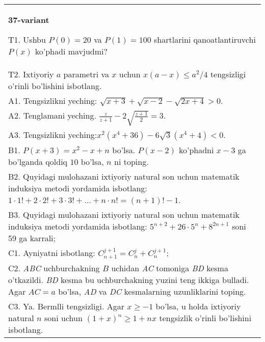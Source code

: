 \documentclass{article}
\begin{document}
\begin{tabular}{m{17cm}}
\textbf{37-variant}
\newline

T1. Ushbu \(P(0) = 20\) va \(P(1) = 100\) shartlarini qanoatlantiruvchi \(P(x)\) ko'phadi mavjudmi? \\
T2. Ixtiyoriy \(a\) parametri va \(x\) uchun \(x(a - x) \leq a^{2}/4\) tengsizligi o'rinli bo'lishini isbotlang. \\
A1. Tengsizlikni yeching: \(\sqrt{x + 3} + \sqrt{x - 2} - \sqrt{2x + 4} > 0\). \\
A2. Tenglamani yeching. \(\frac{z}{z + 1} - 2\sqrt{\frac{z + 1}{2}} = 3\). \\
A3. Tengsizlikni yeching:\(x^{2}\left( x^{4} + 36 \right) - 6\sqrt{3}\left( x^{4} + 4 \right) < 0\). \\
B1. \(P(x + 3) = x^{2} - x + n\) bo'lsa. \(P(x - 2)\) ko'phadni \(x - 3\) ga bo'lganda qoldiq \(10\) bo'lsa, \(n\) ni toping. \\
B2. Quyidagi mulohazani ixtiyoriy natural son uchun matematik induksiya metodi yordamida isbotlang: \(1 \cdot 1! + 2 \cdot 2! + 3 \cdot 3! + \ldots + n \cdot n! = (n + 1)! - 1\). \\
B3. Quyidagi mulohazani ixtiyoriy natural son uchun matematik induksiya metodi yordamida isbotlang: \(5^{n + 2} + 26 \cdot 5^{n} + 8^{2n + 1}\) soni 59 ga karrali; \\
C1. Ayniyatni isbotlang: \(C_{n + 1}^{j + 1} = C_{n}^{j} + C_{n}^{j + 1}\); \\
C2. \emph{ABC} uchburchakning \(B\) uchidan \emph{AC} tomoniga \emph{BD} kesma o'tkazildi. \emph{BD} kesma bu uchburchakning yuzini teng ikkiga bulladi. Agar \(AC = a\) bo'lsa, \emph{AD} va \emph{DC} kesmalarning uzunliklarini toping. \\
C3. Ya. Bermlli tengsizligi. Agar \(x \geq - 1\) bo'lsa, u holda ixtiyoriy natural \(n\) soni uchun \((1 + x)^{n} \geq 1 + nx\) tengsizlik o'rinli bo'lishini isbotlang. \\

\end{tabular}
\vspace{1cm}
\end{document}
